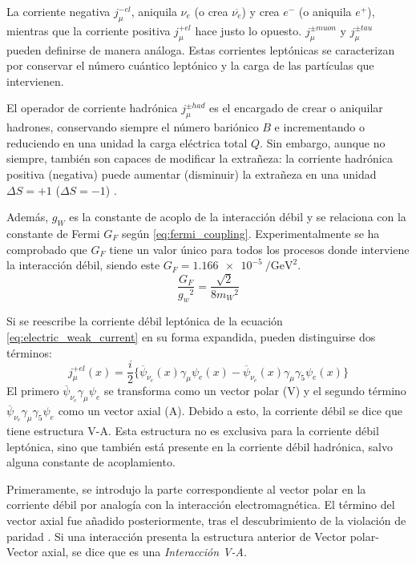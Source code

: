 La corriente negativa $j_{\mu }^{-el}$, aniquila $\nu_e$ (o crea $\overline{\nu_e}$) y crea $e^-$ (o aniquila $e^+$), mientras que la corriente positiva $j_{\mu }^{+el}$ hace justo lo opuesto. $j_{\mu }^{\pm muon}$ y $j_{\mu }^{\pm tau}$ pueden definirse de manera análoga. Estas corrientes leptónicas se caracterizan por conservar el número cuántico leptónico y la carga de las partículas que intervienen. 

El operador de corriente hadrónica $j_{\mu} ^{\pm had}$ es el encargado de crear o aniquilar hadrones, conservando siempre el número bariónico $B$ e incrementando o reduciendo en una unidad la carga eléctrica total $Q$. Sin embargo, aunque no siempre, también son capaces de modificar la extrañeza: la corriente hadrónica positiva (negativa) puede aumentar (disminuir) la extrañeza en una unidad $\Delta S = +1$ ($\Delta S = -1$) \cite{notas2020}.

Además, $g_W$ es la constante de acoplo de la interacción débil y se relaciona con la constante de Fermi $G_F$ según \ref{eq:fermi_coupling}. Experimentalmente se ha comprobado que $G_F$ tiene un valor único para todos los procesos donde interviene la interacción débil, siendo este $G_{F}= \SI{1,166e-5}{\per\GeV\squared}$.
\begin{equation}
\dfrac{G_{F}}{{g_{w}}^2}=\dfrac{\sqrt{2}}{8{m_{W}}^2}\label{eq:fermi_coupling}
\end{equation}

Si se reescribe la corriente débil leptónica de la ecuación \ref{eq:electric_weak_current} en su forma expandida, pueden distinguirse dos términos:
\begin{equation}
j_{\mu}^{+el}\left(x\right)= \dfrac{i}{2} \{ \overline{\psi}_{{\nu}_{e}}\left(x\right)\gamma _{\mu}\psi_{e}\left( x\right)- \overline{\psi}_{{\nu}_{e}}\left(x\right)\gamma _{\mu}\gamma_{5}\psi_{e}\left( x\right) \}
\end{equation}
El primero $\overline{\psi}_{{\nu}_{e}}\gamma _{\mu}\psi_{e}$ se transforma como un vector polar (V) y el segundo término $\overline{\psi}_{{\nu}_{e}}\gamma _{\mu}\gamma_{5}\psi_{e}$ como un vector axial (A). Debido a esto, la corriente débil se dice que tiene estructura V-A. Esta estructura no es exclusiva para la corriente débil leptónica, sino que también está presente en la corriente débil hadrónica, salvo alguna constante de acoplamiento. 

Primeramente, se introdujo la parte correspondiente al vector polar en la corriente débil por analogía con la interacción electromagnética. El término del vector axial fue añadido posteriormente, tras el descubrimiento de la violación de paridad \cite{Paschos}. Si una interacción presenta la estructura anterior de Vector polar- Vector axial, se dice que es una \textit{Interacción V-A}.

